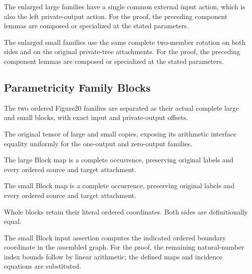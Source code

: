The enlarged large families have a single common external input action, which is also the left private-output action.
For the proof, the preceding component lemmas are composed or specialized at the stated parameters.
\par{}

The enlarged small families use the same complete two-member rotation on both sides and on the original private-tree attachments.
For the proof, the preceding component lemmas are composed or specialized at the stated parameters.
\par{}

\subsection{Parametricity Family Blocks}
The two ordered Figure20 families are separated as their actual complete large and small blocks, with exact input and private-output offsets.

The original tensor of large and small copies, exposing its arithmetic interface equality uniformly for the one-output and zero-output families.
\par{}

The large Block map is a complete occurrence, preserving original labels and every ordered source and target attachment.
\par{}

The small Block map is a complete occurrence, preserving original labels and every ordered source and target attachment.
\par{}

Whole blocks retain their literal ordered coordinates.
Both sides are definitionally equal.
\par{}

The small Block input assertion computes the indicated ordered boundary coordinate in the assembled graph.
For the proof, the remaining natural-number index bounds follow by linear arithmetic; the defined maps and incidence equations are substituted.
\par{}

